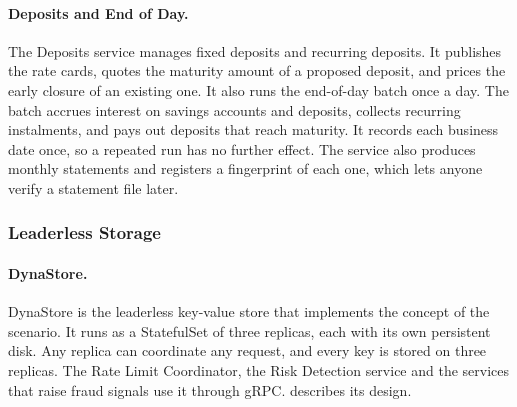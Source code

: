 \documentclass[11pt,a4paper]{article}
\begin{document}
\paragraph{Deposits and End of Day.} The Deposits service manages fixed deposits and recurring deposits. It publishes the rate cards, quotes the maturity amount of a proposed deposit, and prices the early closure of an existing one. It also runs the end-of-day batch once a day. The batch accrues interest on savings accounts and deposits, collects recurring instalments, and pays out deposits that reach maturity. It records each business date once, so a repeated run has no further effect. The service also produces monthly statements and registers a fingerprint of each one, which lets anyone verify a statement file later.

\subsubsection{Leaderless Storage}

\paragraph{DynaStore.} DynaStore is the leaderless key-value store that implements the concept of the scenario. It runs as a StatefulSet of three replicas, each with its own persistent disk. Any replica can coordinate any request, and every key is stored on three replicas. The Rate Limit Coordinator, the Risk Detection service and the services that raise fraud signals use it through gRPC.  describes its design.
\end{document}
